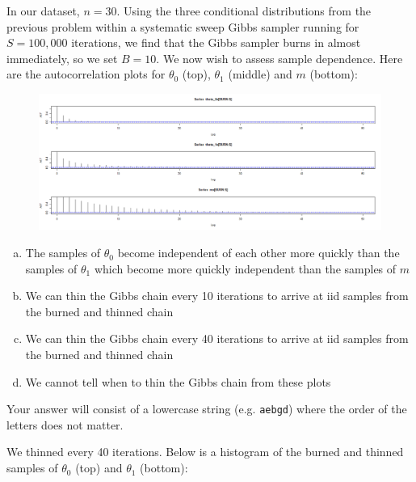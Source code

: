 \documentclass[12pt,landscape]{article}
\newcommand{\instr}{\small Your answer will consist of a lowercase string (e.g. \texttt{aebgd}) where the order of the letters does not matter. \normalsize}
\begin{document}


\problem{} In our dataset, $n = 30$. Using the three conditional distributions from the previous problem within a systematic sweep Gibbs sampler running for $S=100,000$ iterations, we find that the Gibbs sampler burns in almost immediately, so we set $B=10$. We now wish to assess sample dependence. Here are the autocorrelation plots for $\theta_0$ (top), $\theta_1$ (middle) and $m$ (bottom):

\vspace{-0.3cm}
\begin{figure}[h]
\centering
\includegraphics[width=9in]{acfs.png}
\end{figure}

\vspace{-0.2cm}\benum{} 

\begin{enumerate}[(a)]
\item The samples of $\theta_0$ become independent of each other more quickly than the samples of $\theta_1$ which become more quickly independent than the samples of $m$
\item We can thin the Gibbs chain every 10 iterations to arrive at iid samples from the burned and thinned chain
\item We can thin the Gibbs chain every 40 iterations to arrive at iid samples from the burned and thinned chain
\item We cannot tell when to thin the Gibbs chain from these plots
\end{enumerate}
\eenum\instr\pagebreak



\problem{}  We thinned every 40 iterations. Below is a histogram of the burned and thinned samples of $\theta_0$ (top) and $\theta_1$ (bottom):
\end{document}
